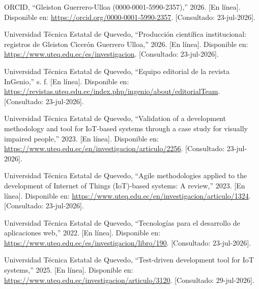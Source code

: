 \documentclass[10pt,a4paper]{article}
\begin{document}
\begingroup
\scriptsize
\begin{enumerate}[label={\textbf{[\arabic*]}},leftmargin=1.55em,itemsep=1pt,topsep=1pt]
  \item ORCID, ``Gleiston Guerrero-Ulloa (0000-0001-5990-2357),'' 2026. [En línea]. Disponible en: \url{https://orcid.org/0000-0001-5990-2357}. [Consultado: 23-jul-2026].
  \item Universidad Técnica Estatal de Quevedo, ``Producción científica institucional: registros de Gleiston Cicerón Guerrero Ulloa,'' 2026. [En línea]. Disponible en: \url{https://www.uteq.edu.ec/es/investigacion}. [Consultado: 23-jul-2026].
  \item Universidad Técnica Estatal de Quevedo, ``Equipo editorial de la revista InGenio,'' s. f. [En línea]. Disponible en: \url{https://revistas.uteq.edu.ec/index.php/ingenio/about/editorialTeam}. [Consultado: 23-jul-2026].
  \item Universidad Técnica Estatal de Quevedo, ``Validation of a development methodology and tool for IoT-based systems through a case study for visually impaired people,'' 2023. [En línea]. Disponible en: \url{https://www.uteq.edu.ec/en/investigacion/articulo/2256}. [Consultado: 23-jul-2026].
  \item Universidad Técnica Estatal de Quevedo, ``Agile methodologies applied to the development of Internet of Things (IoT)-based systems: A review,'' 2023. [En línea]. Disponible en: \url{https://www.uteq.edu.ec/en/investigacion/articulo/1324}. [Consultado: 23-jul-2026].
  \item Universidad Técnica Estatal de Quevedo, ``Tecnologías para el desarrollo de aplicaciones web,'' 2022. [En línea]. Disponible en: \url{https://www.uteq.edu.ec/es/investigacion/libro/190}. [Consultado: 23-jul-2026].
  \item Universidad Técnica Estatal de Quevedo, ``Test-driven development tool for IoT systems,'' 2025. [En línea]. Disponible en: \url{https://www.uteq.edu.ec/investigacion/articulo/3120}. [Consultado: 29-jul-2026].
\end{enumerate}
\endgroup
\end{document}
